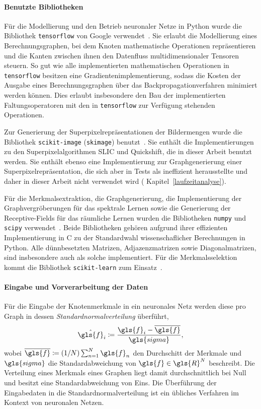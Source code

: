 \paragraph{Benutzte Bibliotheken}
\label{benutzte_bibliotheken}

Für die Modellierung und den Betrieb neuronaler Netze in Python wurde die Bibliothek \texttt{tensorflow} von Google verwendet~\cite{tensorflow}.
Sie erlaubt die Modellierung eines Berechnungsgraphen, bei dem Knoten mathematische Operationen repräsentieren und die Kanten zwischen ihnen den Datenfluss multidimensionaler Tensoren steuern.
So gut wie alle implementierten mathematischen Operationen in \texttt{tensorflow} besitzen eine Gradientenimplementierung, sodass die Kosten der Ausgabe eines Berechnungsgraphen über das Backpropagationverfahren minimiert werden können.
Dies erlaubt insbesondere den Bau der implementierten Faltungsoperatoren mit den in \texttt{tensorflow} zur Verfügung stehenden Operationen.

Zur Generierung der Superpixelrepräsentationen der Bildermengen wurde die Bibliothek \texttt{scikit-image} (\texttt{skimage}) benutzt~\cite{scikit}.
Sie enthält die Implementierungen zu den Superpixelalgorithmen \gls{SLIC} und Quickshift, die in dieser Arbeit benutzt werden.
Sie enthält ebenso eine Implementierung zur Graphgenerierung einer Superpixelrepräsentation, die sich aber in Tests als ineffizient herausstellte und daher in dieser Arbeit nicht verwendet wird (\vgl{} Kapitel~\ref{laufzeitanalyse}).

Für die Merkmalsextraktion, die Graphgenerierung, die Implementierung der Graphvergröberungen für das spektrale Lernen sowie die Generierung der Receptive-Fields für das räumliche Lernen wurden die Bibliotheken \texttt{numpy} und \texttt{scipy} verwendet~\cite{numpy, scipy}.
Beide Bibliotheken gehören aufgrund ihrer effizienten Implementierung in C zu der Standardwahl wissenschaflicher Berechnungen in Python.
Alle dünnbesetzten Matrizen, \dhe{} Adjazenzmatrizen sowie Diagonalmatrizen, sind insbesondere auch als solche implementiert.
Für die Merkmalsselektion kommt die Bibliothek \texttt{scikit-learn} zum Einsatz~\cite{scikitlearn}.

\paragraph{Eingabe und Vorverarbeitung der Daten}

Für die Eingabe der Knotenmerkmale in ein neuronales Netz werden diese pro Graph in dessen \emph{Standardnormalverteilung} überführt, \dhe{}~\cite{tensorflow}
\begin{equation*}
  \hat{\gls{f}}_i \coloneqq \frac{\gls{f}_i - \overline{\gls{f}}}{\gls{sigma}},
\end{equation*}
wobei $\overline{\gls{f}} \coloneqq \left(1/N\right) \sum_{n=1}^N \gls{f}_n$ den Durchschitt der Merkmale und $\gls{sigma}$ die Standardabweichung von $\gls{f} \in \gls{R}^N$ beschreibt.
Die Verteilung eines Merkmals eines Graphen liegt damit durchschnittlich bei Null und besitzt eine Standardabweichung von Eins.
Die Überführung der Eingabedaten in die Standardnormalverteilung ist ein übliches Verfahren im Kontext von neuronalen Netzen.

